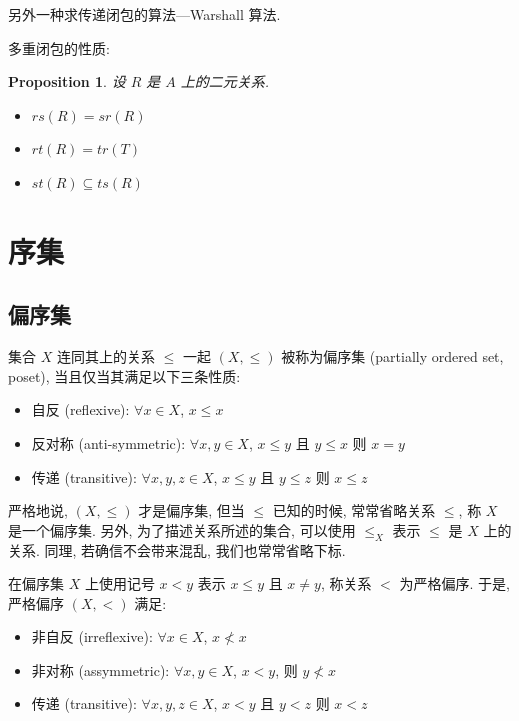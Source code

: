 \documentclass[UTF8]{ctexart}
\theoremstyle{mystyle}
\newtheorem{proposition}{Proposition}[section]
\theoremstyle{myremark}
\theoremstyle{plain}
\begin{document}
另外一种求传递闭包的算法---Warshall 算法.

多重闭包的性质:
\begin{proposition}
    设 $ R $ 是 $ A $ 上的二元关系.
    \begin{itemize}
        \item $ rs(R) = sr(R) $
        \item $ rt(R) = tr(T) $
        \item $ st(R) \subseteq ts(R) $
    \end{itemize}
\end{proposition}


\section{序集}
\subsection{偏序集}
\begin{definition}
    集合 $ X $ 连同其上的关系 $ \le $ 一起 $ (X, \le) $ 被称为偏序集 (partially ordered set, poset), 当且仅当其满足以下三条性质:
    \begin{itemize}
        \item 自反 (reflexive): $ \forall x \in X $, $ x \le x $
        \item 反对称 (anti-symmetric): $ \forall x, y \in X $, $ x \le y $ 且 $ y \le x $ 则 $ x = y $
        \item 传递 (transitive): $ \forall x, y, z \in X $, $ x \le y $ 且 $ y \le z $ 则 $ x \le z $
    \end{itemize}
\end{definition}

严格地说, $ (X, \le) $ 才是偏序集, 但当 $ \le $ 已知的时候, 常常省略关系 $ \le $, 称 $ X $ 是一个偏序集. 另外, 为了描述关系所述的集合, 可以使用 $ \le_X $ 表示 $ \le $ 是 $ X $ 上的关系. 同理, 若确信不会带来混乱, 我们也常常省略下标.


\begin{definition}
    在偏序集 $ X $ 上使用记号 $ x < y $ 表示 $ x \le y $ 且 $ x \neq y $, 称关系 $ < $ 为严格偏序. 于是, 严格偏序 $ (X, <) $ 满足:
    \begin{itemize}
        \item 非自反 (irreflexive): $ \forall x \in X $, $ x \not < x $
        \item 非对称 (assymmetric): $ \forall x, y \in X $, $ x < y $, 则 $ y \not < x $
        \item 传递 (transitive): $ \forall x, y, z \in X $, $ x < y $ 且 $ y < z $ 则 $ x < z $
    \end{itemize}
\end{definition}
\end{document}
